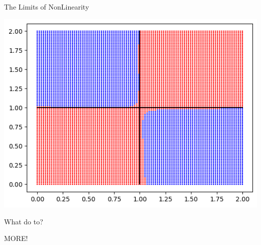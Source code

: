 \documentclass[]{SangerLibrary/sanger-present}
\begin{document}
\begin{frame}{The Limits of NonLinearity}
\begin{minipage}{0.5\linewidth}
{			\centering \includegraphics[width=\linewidth,height=0.8\paperheight,keepaspectratio=true]{xor_10.png}}

		\end{minipage}
		

	\end{frame}
	

	\begin{frame}{What do to?}
		\begin{center}
			\pause MORE!
		\end{center}
	\end{frame}
\end{document}
